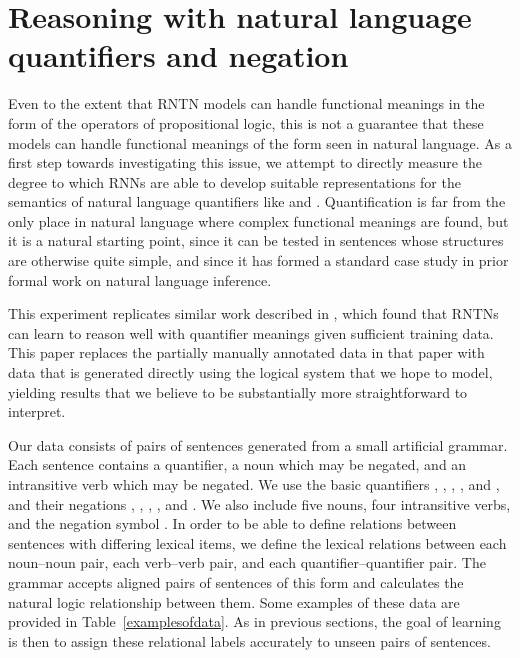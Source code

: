 \section{Reasoning with natural language quantifiers and negation}\label{sec:quantifiers}

Even to the extent that RNTN models can handle functional meanings in
the form of the operators of propositional logic, this is not a
guarantee that these models can handle functional meanings of the form
seen in natural language. As a first step towards investigating this
issue, we attempt to directly measure the degree to which RNNs are
able to develop suitable representations for the semantics of natural language
quantifiers like  and . Quantification is far from
the only place in natural language where complex functional meanings
are found, but it is a natural starting point, since it can be tested
in sentences whose structures are otherwise quite simple, and since it
has formed a standard case study in prior formal work on natural
language inference.


This experiment replicates similar work described in
\cite{bowman2013can}, which found that RNTNs can learn to reason well
with quantifier meanings given sufficient training data. This paper
replaces the partially manually annotated data in that paper with data
that is generated directly using the logical system that we hope to
model, yielding results that we believe to be substantially more
straightforward to interpret.

Our data consists of pairs of sentences generated from a small
artificial grammar. Each sentence contains a quantifier, a noun which
may be negated, and an intransitive verb which may be negated. We use
the basic quantifiers , , , , and
, and their negations ,
, , , and
. We also include five nouns, four intransitive
verbs, and the negation symbol . In order to be able to define
relations between sentences with differing lexical items, we define
the lexical relations between each noun--noun pair, each verb--verb
pair, and each quantifier--quantifier pair. The grammar accepts
aligned pairs of sentences of this form and calculates the natural
logic relationship between them.  Some examples of these data are
provided in Table~\ref{examplesofdata}.  As in previous sections, the
goal of learning is then to assign these relational labels accurately
to unseen pairs of sentences.

